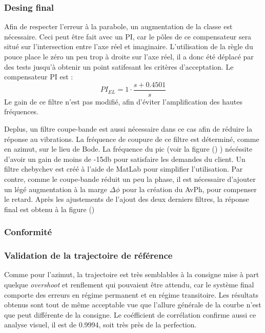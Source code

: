 \documentclass{udes_rapport} %
\begin{document}
\subsubsection{Desing final}
Afin de respecter l'erreur à la parabole, un augmentation de la classe est nécessaire. Ceci peut être fait avec un PI, car le pôles de ce compensateur sera situé sur l'intersection entre l'axe réel et imaginaire. L'utilisation de la règle du pouce place le zéro un peu trop à droite sur l'axe réel, il a donc été déplacé par des tests jusqu'à obtenir un point satifesant les critères d'acceptation. Le compensateur PI est :
\[PI_{EL} = 1 \cdot \frac{s+0.4501}{s}\]
Le gain de ce filtre n'est pas modifié, afin d'éviter l'amplification des hautes fréquences.

Deplus, un filtre coupe-bande est aussi nécessaire dans ce cas afin de réduire la réponse au vibrations. La fréquence de coupure de ce filtre est déterminé, comme en azimut, sur le lieu de Bode. La fréquence du pic (voir la figure () ) nécéssite d'avoir un gain de moins de -15db pour satisfaire les demandes du client. Un filtre chebychev est créé à l'aide de MatLab pour simplifier l'utilisation. Par contre, comme le coupe-bande réduit un peu la phase, il est nécessaire d'ajouter un légé augmentation à la marge $\Delta \phi$ pour la création du AvPh, pour compenser le retard.
Après les ajustements de l'ajout des deux derniers filtres, la réponse final est obtenu à la figure () 


\subsubsection{Conformité}
\subsubsection{Validation de la trajectoire de référence}
Comme pour l'azimut, la trajectoire est très semblables à la consigne mise à part quelque \textit{overshoot} et renflement qui pouvaient être attendu, car  le système final comporte des erreurs en régime permanent et en régime transitoire. Les résultats obtenus sont tout de même acceptable vue que l'allure générale de la courbe n'est que peut différente de la consigne. Le coéfficient de corrélation confirme aussi ce analyse visuel, il est de 0.9994, soit très près de la perfection.
\end{document}
